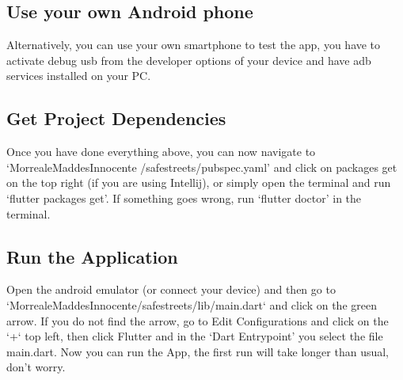 \documentclass[../ITD.tex]{subfiles}
\begin{document}
\subsection{Use your own Android phone}\label{subsec:use-your-own-android-phone}
    Alternatively, you can use your own smartphone to test the app, you have to activate debug usb from
    the developer options of your device and have adb services installed on your PC.

\subsection{Get Project Dependencies}\label{subsec:get-project-dependencies}
    Once you have done everything above, you can now navigate to `MorrealeMaddesInnocente
    /safestreets/pubspec.yaml'
    and click on packages get on the top right (if you are using Intellij), or simply open the terminal and run
    `flutter packages get'.
    If something goes wrong, run `flutter doctor' in the terminal.
\subsection{Run the Application}\label{subsec:run-the-application}
    Open the android emulator (or connect your device) and then go to\newline
    `MorrealeMaddesInnocente/safestreets/lib/main.dart` and click on the green arrow.
    If you do not find the arrow, go to Edit Configurations and click on the `+` top left,
    then click Flutter and in the `Dart Entrypoint' you select the file main.dart.
    Now you can run the App, the first run will take longer than usual, don't worry.
\end{document}
